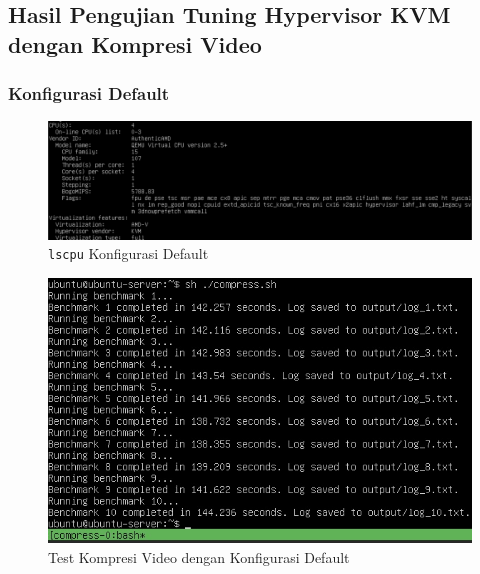 \chapter{\babEmpat}

\section{Hasil Pengujian Tuning Hypervisor KVM dengan Kompresi Video}

\subsection{Konfigurasi Default}
\begin{figure}
    \centering
    \includegraphics[width=1\textwidth]
    {assets/pics/video-compression-test/lscpu_original.jpeg}
    \caption{\texttt{lscpu} Konfigurasi Default}
    \label{fig:lscpu_video_compression_test_original}
\end{figure}

\begin{figure}
    \centering
    \includegraphics[width=1\textwidth]
    {assets/pics/video-compression-test/original.jpeg}
    \caption{Test Kompresi Video dengan Konfigurasi Default}
    \label{fig:video_compression_test_original}
\end{figure}

